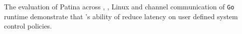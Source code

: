 The evaluation of Patina across \cos , \name , Linux and channel communication of {\tt Go} runtime demonstrate that \name 's ability of reduce latency on user defined system control policies.







